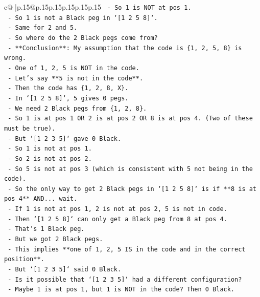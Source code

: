 \documentclass{article}
\begin{document}
{\begin{supertabular}{c@{$\;$}|p{.15\linewidth}@{}p{.15\linewidth}p{.15\linewidth}p{.15\linewidth}p{.15\linewidth}p{.15\linewidth}}
{{{\texttt{        {-} So 1 is NOT at pos 1.} \\
\texttt{        {-} So 1 is not a Black peg in `{[}1 2 5 8{]}`.} \\
\texttt{        {-} Same for 2 and 5.} \\
\texttt{        {-} So where do the 2 Black pegs come from?} \\
\texttt{        {-} **Conclusion**: My assumption that the code is \{1, 2, 5, 8\} is wrong.} \\
\texttt{        {-} One of 1, 2, 5 is NOT in the code.} \\
\texttt{        {-} Let's say **5 is not in the code**.} \\
\texttt{        {-} Then the code has \{1, 2, 8, X\}.} \\
\texttt{        {-} In `{[}1 2 5 8{]}`, 5 gives 0 pegs.} \\
\texttt{        {-} We need 2 Black pegs from \{1, 2, 8\}.} \\
\texttt{        {-} So 1 is at pos 1 OR 2 is at pos 2 OR 8 is at pos 4. (Two of these must be true).} \\
\texttt{        {-} But `{[}1 2 3 5{]}` gave 0 Black.} \\
\texttt{        {-} So 1 is not at pos 1.} \\
\texttt{        {-} So 2 is not at pos 2.} \\
\texttt{        {-} So 5 is not at pos 3 (which is consistent with 5 not being in the code).} \\
\texttt{        {-} So the only way to get 2 Black pegs in `{[}1 2 5 8{]}` is if **8 is at pos 4** AND... wait.} \\
\texttt{        {-} If 1 is not at pos 1, 2 is not at pos 2, 5 is not in code.} \\
\texttt{        {-} Then `{[}1 2 5 8{]}` can only get a Black peg from 8 at pos 4.} \\
\texttt{        {-} That's 1 Black peg.} \\
\texttt{        {-} But we got 2 Black pegs.} \\
\texttt{        {-} This implies **one of 1, 2, 5 IS in the code and in the correct position**.} \\
\texttt{        {-} But `{[}1 2 3 5{]}` said 0 Black.} \\
\texttt{        {-} Is it possible that `{[}1 2 3 5{]}` had a different configuration?} \\
\texttt{        {-} Maybe 1 is at pos 1, but 1 is NOT in the code? Then 0 Black.} \\
}}}
\end{supertabular}}
\end{document}
